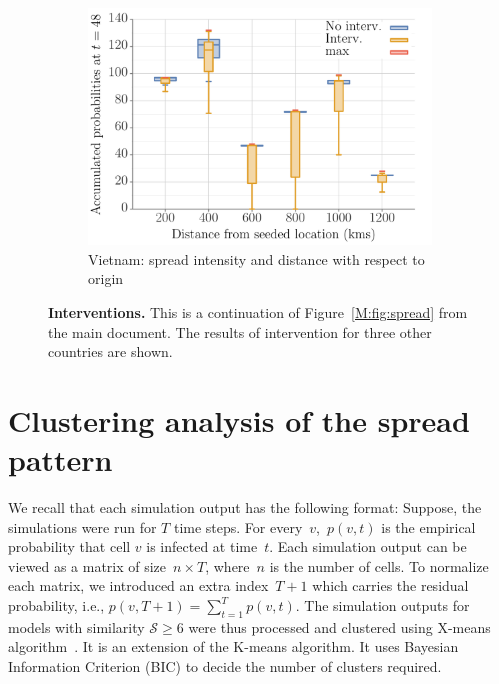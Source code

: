 \documentclass[10pt]{article}
\newcommand{\similarity}{\mathcal{S}}
\theoremstyle{definition}
\begin{document}
\begin{figure}[!ht]
\begin{subfigure}[b]{.32\textwidth}
\includegraphics[width=\textwidth]{../cellular_automata/results/dist_inf_plots/VN_dist_prob_B_box.pdf}
\caption{Vietnam: spread intensity and distance with respect to
origin\label{fig:vnmBContourBox}}
\end{subfigure}
\caption{\textbf{Interventions.} This is a continuation of
    Figure~\ref{M:fig:spread} from the main document. The results of intervention for three
    other countries are shown. \label{fig:intervene}}
\end{figure}


\section{Clustering analysis of the spread pattern}
\label{sec:cluster}
We recall that each simulation output has the following format: Suppose,
the simulations were run for $T$ time steps. For every~$v$,~$p(v,t)$ is the
empirical probability  that cell $v$ is infected at time~$t$. Each
simulation output can be viewed as a matrix of size~$n\times T$, where~$n$
is the number of cells. To normalize each matrix, we introduced an extra
index~$T+1$ which carries the residual probability, i.e.,
$p(v,T+1)=\sum_{t=1}^Tp(v,t)$. The simulation outputs for models with similarity $\similarity\ge6$ were
thus processed and clustered using X-means
algorithm~\cite{pelleg2000x,andrei_novikov_2018_1491324}. It is an
extension of the K-means algorithm. It uses Bayesian Information Criterion
(BIC) to decide the number of clusters required. 
\end{document}
